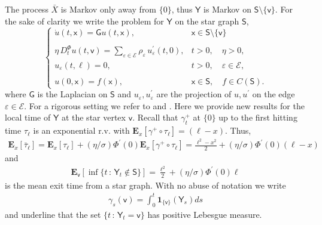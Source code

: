 \documentclass[[11pt,a4paper,reqno]{article}
\numberwithin{equation}{section}
\begin{document}
The process $\bar{X}$ is Markov only away from $\{0\}$, thus $\mathsf{Y}$ is Markov on $\mathsf{S} \setminus \{\mathsf{v}\}$. For the sake of clarity we write the problem for $\mathsf{Y}$ on the star graph $\mathsf{S}$,
\begin{equation}
\left\lbrace
\begin{array}{ll}
\displaystyle \dot{u}(t, \mathsf{x}) = \mathsf{G} u(t, \mathsf{x}), & \mathsf{x} \in \mathsf{S} \setminus \{\mathsf{v}\}\\
\\
\displaystyle \eta \,D^\Phi_t u(t, \mathsf{v}) = \sum_{\varepsilon \in \mathcal{E}} \rho_\varepsilon\, u^\prime_\varepsilon(t, 0), & t>0, \quad \eta >0,\\  
\displaystyle u_\varepsilon(t, \ell) = 0, & t>0, \quad \varepsilon \in \mathcal{E},\\ 
\\
\displaystyle u(0, \mathsf{x}) = f(\mathsf{x}), & \mathsf{x} \in \mathsf{S}, \quad f \in C(\mathsf{S}).
\end{array}
\right.
\label{NLBVPGraphINTRO}
\end{equation}
where $\mathsf{G}$ is the Laplacian on $\mathsf{S}$ and $u_\varepsilon, u^\prime_\varepsilon$ are the projection of $u, u^\prime$ on the edge $\varepsilon \in \mathcal{E}$. For a rigorous setting we refer to \cite{BonDovStar} and \cite{BonColDovPag}. Here we provide new results for the local time of $\mathsf{Y}$ at the star vertex $\mathsf{v}$. Recall that $\gamma^+_t$ at $\{0\}$ up to the first hitting time $\tau_\ell$ is an exponential r.v. with $\mathbf{E}_x[\gamma^+ \circ \tau_\ell] = (\ell - x)$. Thus,
\begin{align*}
\mathbf{E}_x[\bar{\tau}_\ell] = \mathbf{E}_x[\tau_\ell] + (\eta/\sigma) \Phi^\prime(0) \mathbf{E}_x[\gamma^+ \circ \tau_\ell] = \frac{\ell^2 - x^2}{2} + (\eta/\sigma) \Phi^\prime(0) (\ell - x)
\end{align*}
and
\begin{align*}
\mathbf{E}_{\mathsf{v}} [\inf\{t\,:\, \mathsf{Y}_t \notin \mathsf{S} \}] = \frac{\ell^2}{2} + (\eta/\sigma) \Phi^\prime(0) \ell
\end{align*}
is the mean exit time from a star graph. With no abuse of notation we write 
\begin{align*}
\gamma_s(\mathsf{v}) = \int_0^t \mathbf{1}_{\{\mathsf{v}\}}(\mathsf{Y}_s) ds 
\end{align*}
and underline that the set $\{t\,:\, \mathsf{Y}_t = \mathsf{v}\}$ has positive Lebesgue measure.
\end{document}
